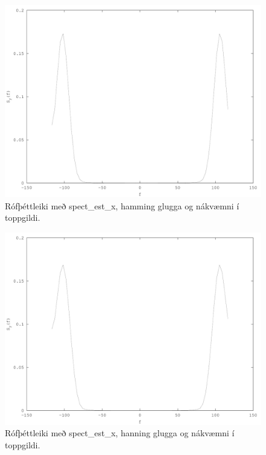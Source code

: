 \documentclass[11pt,a4paper]{article}
\begin{document}
\begin{figure}[htbp]
    \begin{center}
        \includegraphics[scale=0.5]{fig5.pdf}
    \end{center}
    \caption{Rófþéttleiki með spect\_est\_x, hamming glugga og nákvæmni í toppgildi.}
    \label{fig:hamming}
\end{figure}
\begin{figure}[htbp]
    \begin{center}
        \includegraphics[scale=0.5]{fig6.pdf}
    \end{center}
    \caption{Rófþéttleiki með spect\_est\_x, hanning glugga og nákvæmni í toppgildi.}
    \label{fig:hanning}
\end{figure}
\end{document}
